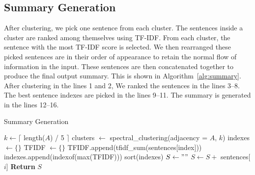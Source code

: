\subsection{Summary Generation}\label{subsec:summary-generation}
After clustering, we pick one sentence from each cluster.
The sentences inside a cluster are ranked among themselves using TF-IDF.
From each cluster, the sentence with the most TF-IDF score is selected.
We then rearranged these picked sentences are in their order of appearance to retain the normal flow of
information in the input.
These sentences are then concatenated together to produce the final output summary.
This is shown in Algorithm~\ref{alg:summary}.
After clustering in the lines 1 and 2, We ranked the sentences in the lines 3--8.
The best sentence indexes are picked in the lines 9--11.
The summary is generated in the lines 12--16.

\begin{algorithm} \caption{Summary Generation} \label{alg:summary}
\begin{algorithmic}[1]
    \State $k \gets \lceil$ length($A$) / 5 $\rceil$
    \State clusters $\gets$ spectral\_clustering(adjacency = $A$, $k$)
    \State indexes $\gets \{\}$
        \State TFIDF $\gets \{\}$
            \State TFIDF.append(tfidf\_sum(sentences[index]))
        \EndFor
        \State indexes.append(indexof(max(TFIDF)))
    \EndFor
    \State sort(indexes)
    \State $S \gets ""$
        \State $S \gets S +$ sentences[$i$]
    \EndFor
    \State \textbf{Return} $S$
\end{algorithmic}
\end{algorithm}

